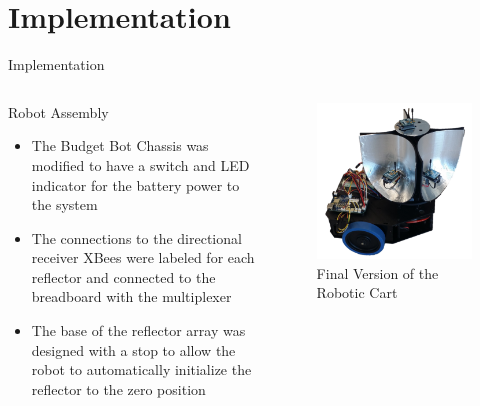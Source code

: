 \documentclass{beamer}
\begin{document}

\section{Implementation}

\begin{frame}{Implementation}
  \begin{columns}
    \begin{block}{Robot Assembly}
      \begin{itemize}
        \item The Budget Bot Chassis was modified to have a switch and LED indicator for the battery power to the system
        \item The connections to the directional receiver XBees were labeled for each reflector and connected to the breadboard with the multiplexer
        \item The base of the reflector array was designed with a stop to allow the robot to automatically initialize the reflector to the zero position
      \end{itemize}
    \end{block}
    \begin{figure}
      \centering
      \includegraphics[width=\textwidth]{figs/img/Finalized_robot.png}
      \caption{Final Version of the Robotic Cart}
      \label{fig:FinalizedRobot}
    \end{figure}
  \end{columns}
\end{frame}
\end{document}
